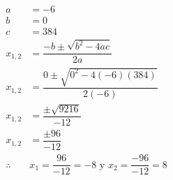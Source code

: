\begin{solutionbox}{10.5cm}
\begin{multicols}{2}
\[\begin{array}{rl}
                a          & =-6
                \\
                b          & =0
                \\
                c          & =384
                \\
                x_{1,2}    & = \dfrac{-b\pm\sqrt{b^2-4ac}}{2a}
                \\[2em]
                x_{1,2}    & = \dfrac{0\pm\sqrt{0^2-4(-6)(384)}}{2(-6)}
                \\[2em]
                x_{1,2}    & = \dfrac{\pm\sqrt{9216}}{-12}
                \\[2em]
                x_{1,2}    & = \dfrac{\pm96}{-12}
                \\[2em]
                \therefore & x_1 =\dfrac{96}{-12}=-8 \text{ y }  x_2
                =\dfrac{-96}{-12}=8                                     \\[2em]
            \end{array}
        \]
    \end{multicols}
\end{solutionbox}
